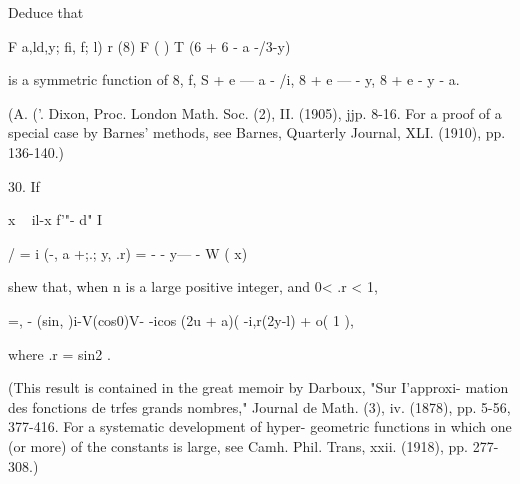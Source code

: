 Deduce that

F a,ld,y; fi, f; l) r (8) F ( ) T (6 + 6 - a -/3-y)

is a symmetric function of 8, f, S + e — a - /i, 8 + e — - y, 8 + e -
y - a.

(A. ('. Dixon, Proc. London Math. Soc. (2), II. (1905), jjp. 8-16. For
a proof of a special case by Barnes' methods, see Barnes, Quarterly
Journal, XLI. (1910), pp. 136-140.)

30. If

x ~ il-x f'"- d" I

/ = i (-, a +;.; y, .r) = - - y— - W ( x) \

shew that, when n is a large positive integer, and 0< .r < 1,

  =, - (sin, )i-V(cos0)V- -icos (2u + a)( -i,r(2y-l) + o( 1 ),

where .r = sin2 .

(This result is contained in the great memoir by Darboux, "Sur
I'approxi- mation des fonctions de trfes grands nombres," Journal de
Math. (3), iv. (1878), pp. 5-56, 377-416. For a systematic development
of hyper- geometric functions in which one (or more) of the constants
is large, see Camh. Phil. Trans, xxii. (1918), pp. 277-308.)

